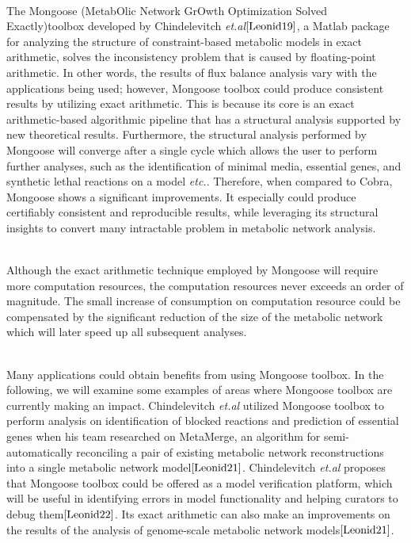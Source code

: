 \documentclass[11pt, a4paper]{article}
\begin{document}
	~\\The Mongoose (MetabOlic Network GrOwth Optimization Solved Exactly)toolbox developed by Chindelevitch \textit{et.al}$\cite{Leonid19}$, a Matlab package for analyzing the structure of constraint-based metabolic models in exact arithmetic, solves the inconsistency problem that is caused by floating-point arithmetic. In other words, the results of flux balance analysis vary with the applications being used; however, Mongoose toolbox could produce consistent results by utilizing exact arithmetic. This is because its core is an exact arithmetic-based algorithmic pipeline that has a structural analysis supported by new theoretical results. Furthermore, the structural analysis performed by Mongoose will converge after a single cycle which allows the user to perform further analyses, such as the identification of minimal media, essential genes, and synthetic lethal reactions on a model \textit{etc.}. Therefore, when compared to Cobra, Mongoose shows a significant improvements. It especially could produce certifiably consistent and reproducible results, while leveraging its structural insights to convert many intractable problem in metabolic network analysis.

	~\\Although the exact arithmetic technique employed by Mongoose will require more computation resources, the computation resources never exceeds an order of magnitude. The small increase of consumption on computation resource could be compensated by the significant reduction of the size of the metabolic network which will later speed up all subsequent analyses.

	~\\Many applications could obtain benefits from using Mongoose toolbox. In the following, we will examine some examples of areas where Mongoose toolbox are currently making an impact. Chindelevitch \textit{et.al} utilized Mongoose toolbox to perform analysis on identification of blocked reactions and prediction of essential genes when his team researched on MetaMerge, an algorithm for semi-automatically reconciling a pair of existing metabolic network reconstructions into a single metabolic network model$\cite{Leonid21}$. Chindelevitch \textit{et.al} proposes that Mongoose toolbox could be offered as a model verification platform, which will be useful in identifying errors in model functionality and helping curators to debug them$\cite{Leonid22}$. Its exact arithmetic can also make an improvements on the results of the analysis of genome-scale metabolic network models$\cite{Leonid21}$.
	\newpage
\end{document}
